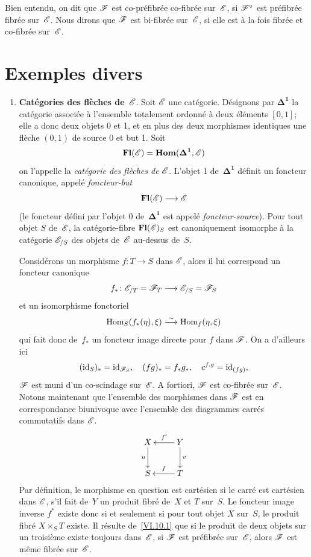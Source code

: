 Bien entendu, on dit que $\cal{F}$ est co-pr\'efibr\'ee \resp co-fibr\'ee
sur~$\cal{E}$, si $\cal{F}^\circ$ est pr\'efibr\'ee \resp fibr\'ee sur~$\cal{E}$. Nous dirons que $\cal{F}$ est bi-fibr\'ee
sur~$\cal{E}$,
si elle est \`a la fois fibr\'ee et co-fibr\'ee sur~$\cal{E}$.

\section{Exemples divers}
\label{VI.11}

\begin{enumerate}

\item[a)] \textbf{Catégories des flèches de}~$\cal{E}$. Soit
$\cal{E}$ une cat\'egorie. D\'esignons par $\mathbf{\Delta^1}$ la
cat\'egorie associ\'ee \`a l'ensemble totalement ordonn\'e
\`a deux \'el\'ements $[0,1]$;
elle a donc deux objets 0 et 1, et en plus des deux morphismes
identiques une fl\`eche $(0,1)$ de source 0 et but 1. Soit
$$
\CatFl(\cal{E})=\SheafHom(\mathbf{\Delta^1},\cal{E})
$$
on l'appelle la \emph{catégorie des flèches de} $\cal{E}$.
L'objet 1 de~$\mathbf{\Delta^1}$ d\'efinit un foncteur canonique,
appel\'e \emph{foncteur-but}
$$
\CatFl(\cal{E})\to \cal{E}
$$
(le foncteur d\'efini par l'objet 0 de~$\mathbf{\Delta^1}$ est
appel\'e \emph{foncteur-source}). Pour tout objet $S$ de~$\cal{E}$,
la cat\'egorie-fibre $\CatFl(\cal{E})_S$ est canoniquement isomorphe
\`a la cat\'egorie $\cal{E}_{/S}$ des objets de~$\cal{E}$
au-dessus de~$S$.

Consid\'erons un morphisme $f\colon T\to S$ dans $\cal{E}$, alors il
lui correspond un foncteur canonique
$$
f_*\colon \cal{E}_{/T}=\cal{F}_T\to \cal{E}_{/S}=\cal{F}_S
$$
et un isomorphisme fonctoriel
$$
\operatorname{Hom}_S(f_*(\eta),\xi)\overset{\sim}{\longrightarrow}\operatorname{Hom}_f(\eta,\xi)
$$
qui fait donc de~$f_*$ un foncteur image directe pour $f$ dans
$\cal{F}$. On a d'ailleurs ici
$$
(\id_S)_*=\id_{\cal{F}_S},\quad (fg)_*=f_*g_*,\quad
c^{f,g}=\id_{(fg)},
$$
\ie $\cal{F}$ est muni d'un co-scindage sur~$\cal{E}$. A fortiori,
$\cal{F}$ est co-fibr\'ee sur~$\cal{E}$. Notons maintenant que
l'ensemble des morphismes dans $\cal{F}$ est en correspondance
biunivoque avec l'ensemble des diagrammes carr\'es commutatifs dans
$\cal{E}$.
$$
\xymatrix{{X}\ar[d]_-u&{Y}\ar[l]_-{f'}\ar[d]^-v\\{S}&{T}\ar[l]_-{f}}
$$
Par
d\'efinition, le morphisme en question est cart\'esien si le
carr\'e est cart\'esien dans $\cal{E}$, \ie s'il fait de~$Y$ un
produit fibr\'e de~$X$ et $T$ sur~$S$. Le foncteur image inverse
$f^*$
existe donc si et seulement si pour tout objet $X$ sur~$S$, le produit
fibr\'e $X\times_ST$ existe. Il r\'esulte de~\ref{VI.10.1} que si
le produit de deux objets sur un troisi\`eme existe toujours dans~$\cal{E}$, \ie si $\cal{F}$ est pr\'efibr\'ee sur~$\cal{E}$,
alors $\cal{F}$ est m\^eme fibr\'ee sur~$\cal{E}$.


\end{enumerate}
